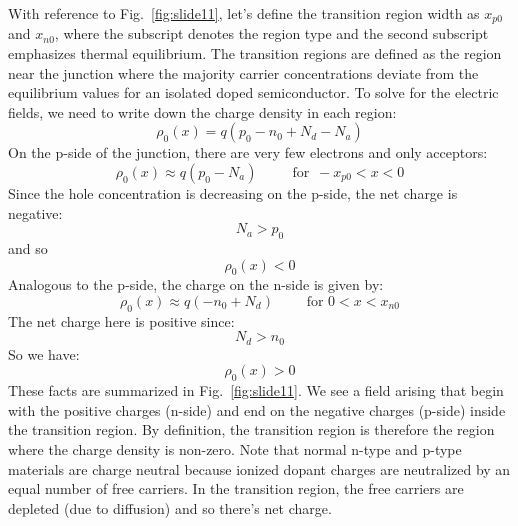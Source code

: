 With reference to Fig.~\ref{fig:slide11}, let's define the transition region width as $x_{p0}$ and $x_{n0}$, where the subscript denotes the region type and the second subscript emphasizes thermal equilibrium.   The transition regions are defined as the region near the junction where the majority carrier concentrations deviate from the equilibrium values for an isolated doped semiconductor.    To solve for the electric fields, we need to write down the charge density in each region:
\begin{equation} 
	{\rho _0}(x) = q({p_0} - {n_0} + {N_d} - {N_a}) 
\end{equation}
On the p-side of the junction, there are very few electrons and only acceptors:
\begin{equation} 
	{\rho _0}(x) \approx q({p_0} - {N_a}) \,\,\,\quad\quad \text{for}\,\,\,  - {x_{p0}} < x < 0 
\end{equation}
Since the hole concentration is decreasing on the p-side, the net charge is negative:
\begin{equation} 
	{N_a} > {p_0} 
\end{equation}
and so
\begin{equation}
	 {\rho _0}(x) < 0 
\end{equation}
Analogous to the p-side, the charge on the n-side is given by:
\begin{equation} 
	{\rho _0}(x) \approx q( - {n_0} + {N_d}) \,\,\quad\quad\text{for}\,\, 0 < x < {x_{n0}}
\end{equation}
The net charge here is positive since:
\begin{equation} 
	{N_d} > {n_0} 
\end{equation}
So we have:
\begin{equation} 
	{\rho _0}(x) > 0 
\end{equation}
These facts are summarized in Fig.~\ref{fig:slide11}.  We see a field arising that begin with the positive charges (n-side) and end on the negative charges (p-side) inside the transition region.  By definition, the transition region is therefore the region where the charge density is non-zero.  Note that normal n-type and p-type materials are charge neutral because ionized dopant charges are neutralized by an equal number of free carriers.  In the transition region, the free carriers are depleted (due to diffusion) and so there's net charge.   
